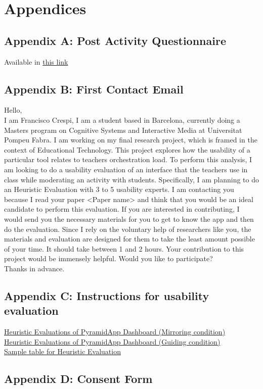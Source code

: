 
\chapter{Appendices}
\section{Appendix A: Post Activity Questionnaire} \label{appendix_questionnaire}
Available in \href{https://www.notion.so/Thesis-V7-243ce3de3fbf40c5bf4bcff946624b5d#55078b471e644637a39bef2929872804}{this link}
\section{Appendix B: First Contact Email} \label{appendix_first_contact}
Hello,\\
I am Francisco Crespi, I am a student based in Barcelona, currently doing a Master\textquotesingle s program on Cognitive Systems and Interactive Media at Universitat Pompeu Fabra. I am working on my final research project, which is framed in the context of Educational Technology. 
This project explores how the usability of a particular tool relates to teacher\textquotesingle s orchestration load. To perform this analysis, I am looking to do a usability evaluation of an interface that the teachers use in class while moderating an activity with students. Specifically, I am planning to do an Heuristic Evaluation with 3 to 5 usability experts. I am contacting you because I read your paper <Paper name> and think that you would be an ideal candidate to perform this evaluation. 
If you are interested in contributing, I would send you the necessary materials for you to get to know the app and then do the evaluation. Since I rely on the voluntary help of researchers like you, the materials and evaluation are designed for them to take the least amount possible of your time. It should take between 1 and 2 hours.
Your contribution to this project would be immensely helpful. Would you like to participate?\\
Thanks in advance.
\section{Appendix C: Instructions for usability evaluation} \label{appendix_usability-evaluation}
\href{https://www.notion.so/Heuristic-Evaluations-of-PyramidApp-Dashboard-Mirroring-condition-fbf0d58ca48a47b89eb0fcb131b7f251}{Heuristic Evaluations of PyramidApp Dashboard (Mirroring condition)}\\
\href{https://www.notion.so/Heuristic-Evaluations-of-PyramidApp-Dashboard-Guiding-condition-306f4aa82cc6416eb43bc873efc3f1cf}{Heuristic Evaluations of PyramidApp Dashboard (Guiding condition)}\\
\href{https://www.notion.so/Thesis-V7-243ce3de3fbf40c5bf4bcff946624b5d#90149a84e369459798acd53bd175f024}{Sample table for Heuristic Evaluation}
\section{Appendix D: Consent Form} \label{appendix_consent}

\newpage
